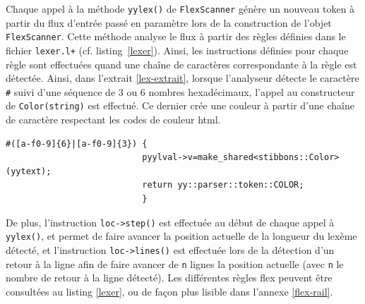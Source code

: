 Chaque appel à la méthode \verb|yylex()| de \verb|FlexScanner| génère un nouveau token à partir du flux d'entrée passé en paramètre lors de la construction de l'objet \verb|FlexScanner|. Cette méthode analyse le flux à partir des règles définies dans le fichier \verb|lexer.l+| (cf. listing~\ref{lexer}). Ainsi, les instructions définies pour chaque règle sont effectuées quand une chaîne de caractères correspondante à la règle est détectée. Ainsi, dans l'extrait \ref{lex-extrait}, lorsque l'analyseur détecte le caractère \verb|#| suivi d'une séquence de 3 ou 6 nombres hexadécimaux, l'appel au constructeur de \verb|Color(string)| est effectué. Ce dernier crée une couleur à partir d'une chaîne de caractère respectant les codes de couleur html.

\begin{lstlisting}[label=lex-extrait,caption=Exemple de séquence d'instructions lors de la détection d'une couleur]
#([a-f0-9]{6}|[a-f0-9]{3}) {
                           pyylval->v=make_shared<stibbons::Color>(yytext);
                           return yy::parser::token::COLOR;
                           }
\end{lstlisting}

De plus, l'instruction \verb|loc->step()| est effectuée au début de chaque appel à \verb|yylex()|, et permet de faire avancer la position actuelle de la longueur du lexème détecté, et l'instruction \verb|loc->lines()| est effectuée lors de la détection d'un retour à la ligne afin de faire avancer de \verb|n| lignes la position actuelle (avec \verb|n| le nombre de retour à la ligne détecté).
Les différentes règles flex peuvent être consultées au listing \ref{lexer}, ou de façon plus lisible dans l'annexe \ref{flex-rail}.
